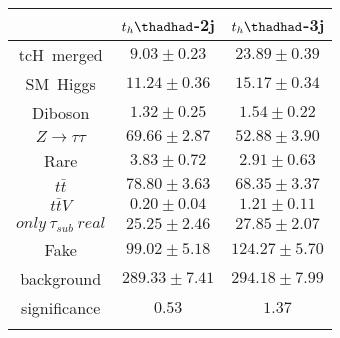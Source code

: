 \centering
\begin{tabular}{ccc} \toprule\toprule
 & $t_{h}\thadhad$-2j & $t_{h}\thadhad$-3j\\\midrule
tcH~merged & $9.03\pm0.23$ & $23.89\pm0.39$\\
SM~Higgs & $11.24\pm0.36$ & $15.17\pm0.34$\\
Diboson & $1.32\pm0.25$ & $1.54\pm0.22$\\
$Z\to\tau\tau$ & $69.66\pm2.87$ & $52.88\pm3.90$\\
Rare & $3.83\pm0.72$ & $2.91\pm0.63$\\
$t\bar{t}$ & $78.80\pm3.63$ & $68.35\pm3.37$\\
$t\bar{t}V$ & $0.20\pm0.04$ & $1.21\pm0.11$\\
$only~\tau_{sub}~real$ & $25.25\pm2.46$ & $27.85\pm2.07$\\
Fake & $99.02\pm5.18$ & $124.27\pm5.70$\\
background & $289.33\pm7.41$ & $294.18\pm7.99$\\
significance & $0.53$ & $1.37$\\
\bottomrule\bottomrule\\
\end{tabular}
